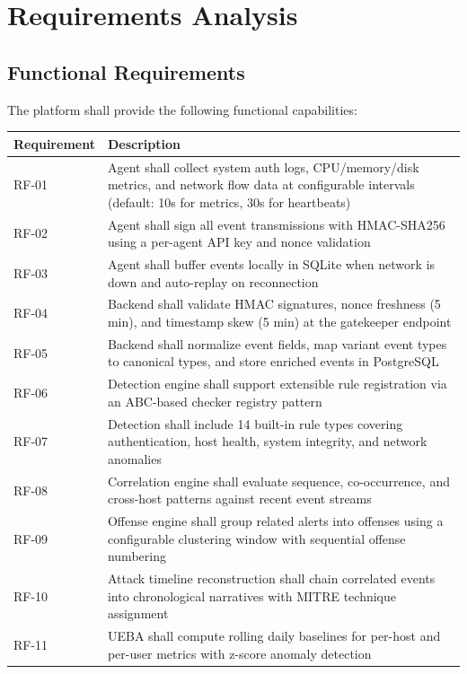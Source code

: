 \section{Requirements Analysis}

\subsection{Functional Requirements}

The platform shall provide the following functional capabilities:

\begin{longtable}{|l|l|}
\hline
\textbf{Requirement} & \textbf{Description} \\
\hline
RF-01 & Agent shall collect system auth logs, CPU/memory/disk metrics, and network flow data at configurable intervals (default: 10s for metrics, 30s for heartbeats) \\
\hline
RF-02 & Agent shall sign all event transmissions with HMAC-SHA256 using a per-agent API key and nonce validation \\
\hline
RF-03 & Agent shall buffer events locally in SQLite when network is down and auto-replay on reconnection \\
\hline
RF-04 & Backend shall validate HMAC signatures, nonce freshness (5 min), and timestamp skew (5 min) at the gatekeeper endpoint \\
\hline
RF-05 & Backend shall normalize event fields, map variant event types to canonical types, and store enriched events in PostgreSQL \\
\hline
RF-06 & Detection engine shall support extensible rule registration via an ABC-based checker registry pattern \\
\hline
RF-07 & Detection shall include 14 built-in rule types covering authentication, host health, system integrity, and network anomalies \\
\hline
RF-08 & Correlation engine shall evaluate sequence, co-occurrence, and cross-host patterns against recent event streams \\
\hline
RF-09 & Offense engine shall group related alerts into offenses using a configurable clustering window with sequential offense numbering \\
\hline
RF-10 & Attack timeline reconstruction shall chain correlated events into chronological narratives with MITRE technique assignment \\
\hline
RF-11 & UEBA shall compute rolling daily baselines for per-host and per-user metrics with z-score anomaly detection \\

\end{longtable}
